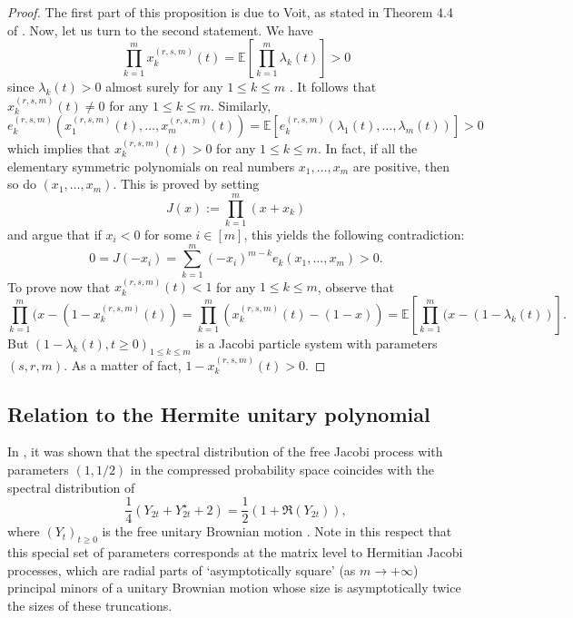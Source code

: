 \documentclass[12pt,reqno]{amsart}
\begin{document}
\begin{proof} The first part of this proposition is due to Voit, as stated in Theorem 4.4 of \cite{MR4781073}. Now, let us turn to the second statement. We have
\begin{equation*}
	\prod_{k=1}^mx_k^{(r,s,m)}(t) = \mathbb{E}\left[\prod_{k=1}^m\lambda_k(t)\right] > 0
\end{equation*}
since $\lambda_k(t) > 0$ almost surely for any $1 \leq k \leq m$ \cite{MR2719370, MR3296535}. It follows that $x_k^{(r,s,m)}(t) \neq 0$ for any $1 \leq k\leq m$. Similarly,
\begin{equation*}
	e_k^{(r,s,m)}(x_1^{(r,s,m)}(t), \dots, x_m^{(r,s,m)}(t)) = \mathbb{E}[e_k^{(r,s,m)}(\lambda_1(t), \dots, \lambda_m(t))] > 0
\end{equation*}
which implies that $x_k^{(r,s,m)}(t) > 0$ for any $1 \leq k\leq m$. In fact, if all the elementary symmetric polynomials on real numbers $x_1, \dots, x_m$ are positive, 
then so do $(x_1, \dots, x_m)$. This is proved by setting
\begin{equation*}
	J(x):= \prod_{k=1}^m(x+x_k)
\end{equation*}
and argue that if $x_i < 0$ for some $i \in [m]$, this yields the following contradiction:
\begin{equation*}
	0 = J(-x_i) = \sum_{k=1}^m (-x_i)^{m-k}e_k(x_1,\dots, x_m) > 0.
\end{equation*}
To prove now that $x_k^{(r,s,m)}(t) < 1$ for any $1 \leq k \leq m$, observe that 
\begin{equation*}
	\prod_{k=1}^m (x-(1-x_k^{(r,s,m)}(t)) =  \prod_{k=1}^m (x_k^{(r,s,m)}(t)-(1-x))
	= \mathbb{E}\left[\prod_{k=1}^m (x-(1-\lambda_k(t))\right].
\end{equation*}
But $(1-\lambda_k(t), t \geq 0)_{1 \leq k \leq m}$ is a Jacobi particle system  with parameters $(s,r,m)$. As a matter of fact, $ 1-x_k^{(r,s,m)}(t) > 0$.
\end{proof}

\subsection{Relation to the Hermite unitary polynomial}
\label{ssec:unitaryhermite}
In \cite{MR3071702}, it was shown that the spectral distribution of the free Jacobi process with parameters $(1,1/2)$ in the compressed probability space coincides with the spectral distribution of 
\begin{equation*}
 \frac{1}{4}(Y_{2t} + Y^{\star}_{2t} + 2) = \frac{1}{2}(1+\Re(Y_{2t})),    
\end{equation*}
where $(Y_t)_{t \geq 0}$ is the free unitary Brownian motion \cite{MR1430721}. Note in this respect that this special set of parameters corresponds at the matrix level to Hermitian Jacobi processes, which are radial parts of `asymptotically square' (as $  m\rightarrow +\infty$) principal minors of a unitary Brownian motion whose size is asymptotically twice the sizes of these truncations.    
\end{document}
